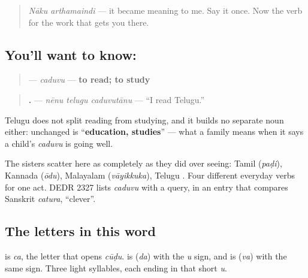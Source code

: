 \label{lesson:TE-C33-caduvu}



\begin{quote}
\emph{Nāku arthamaindi} — it became meaning to me. Say it once. Now the verb for the work that gets you there.
\end{quote}

\subsection*{You'll want to know: }
\begin{quote}
\textbf{} — \emph{caduvu} — \textbf{to read; to study}
\end{quote}

\begin{quote}
\textbf{  .} — \emph{nēnu telugu caduvutānu} — \textquotedblleft{}I read Telugu.\textquotedblright{}
\end{quote}

Telugu does not split reading from studying, and it builds no separate noun either: \textbf{} unchanged is \textquotedblleft{}\textbf{education, studies}\textquotedblright{} — what a family means when it says a child's \emph{caduvu} is going well.

The sisters scatter here as completely as they did over seeing: Tamil \textbf{} (\emph{paḍi}), Kannada \textbf{} (\emph{ōdu}), Malayalam \textbf{} (\emph{vāyikkuka}), Telugu \textbf{}. Four different everyday verbs for one act. DEDR 2327 lists \emph{caduvu} with a query, in an entry that compares Sanskrit \emph{catura}, \textquotedblleft{}clever\textquotedblright{}.

\subsection*{The letters in this word}
\textbf{} is \emph{ca}, the letter that opens \emph{cūḍu}. \textbf{} is \textbf{} (\emph{da}) with the \emph{u} sign, and \textbf{} is \textbf{} (\emph{va}) with the same sign. Three light syllables, each ending in that short \emph{u}.

